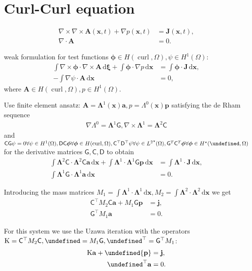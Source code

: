 \documentclass[12pt,a4paper,twoside]{article}
\let\div\undefined
\DeclareMathOperator{\div}{div}
\DeclareMathOperator{\curl}{curl}
\let\L\undefined
\newcommand{\L}{\mathrm{L}}
\newcommand{\K}{\mathrm{K}}
\newcommand{\du}{\,\mathrm{d}}
\newcommand{\ab}{{\mathbf{a}}}
\newcommand{\xb}{{\mathbf{x}}}
\newcommand{\jb}{{\mathbf{j}}}
\newcommand{\pb}{{\mathbf{p}}}
\newcommand{\Ab}{{\mathbf{A}}}
\newcommand{\phib}{{\boldsymbol{\phi}}}
\newcommand{\xib}{{\boldsymbol{\xi}}}
\newcommand{\Jb}{\mathbf{J}}
\newcommand{\C}{\ensuremath{\mathsf{C}}}
\newcommand{\D}{\ensuremath{\mathsf{D}}}
\newcommand{\G}{\ensuremath{\mathsf{G}}}
\newcommand{\Lab}{\ensuremath{\boldsymbol{\Lambda}}}
\numberwithin{equation}{section}
\begin{document}
\section{Curl-Curl equation}
\begin{align*}
\nabla \times \nabla \times \Ab(\xb,t) + \nabla p(\xb,t) &= \Jb(\xb,t), \\
\nabla \cdot \Ab &= 0.
\end{align*}


weak formulation for test functions $\phib \in H(\curl,\Omega),\psi \in H^1(\Omega)$:
\begin{align*}
\int \nabla \times \phib \cdot \nabla \times \Ab \du \xib + \int \phib \cdot \nabla p \du \xb &= \int \phib \cdot \Jb \du \xb, \\
-\int \nabla \psi \cdot \Ab \du \xb &= 0,
\end{align*}
where $\Ab \in H(\curl,\Omega), p \in H^1(\Omega)$.

Use finite element ansatz: $\Ab = \Lab^1(\xb) \ab, p = \Lambda^0(\xb) \pb$ satisfying the de Rham sequence
\begin{align*}
\nabla \Lambda^0 = \Lab^1 \G, \nabla \times \Lab^1 = \Lab^2 \C
\end{align*}
and $ \C \G \psi = 0 \forall \psi \in H^1(\Omega), \D \C \phib \forall \phib \in  H(\curl,\Omega), \C^\top \D^\top \psi \forall \psi  \in {L^2}^\star(\Omega), \G^T \C^T \phib \forall \phib \in  H^\star(\div,\Omega)$ for the derivative matrices $\G, \C, \D$ 
 to obtain
\begin{align*}
\int \Lab^2 \C \cdot \Lab^2 \C \ab \du \xb + \int \Lab^1 \cdot \Lab^1 \G \pb \du \xb &= \int \Lab^1 \cdot \Jb \du \xb, \\
\int \Lab^1 \G \cdot \Lab^1 \ab \du \xb &= 0.
\end{align*}

Introducing the mass matrices $M_1 = \int  \Lab^1 \cdot \Lab^1 \du \xb, M_2 = \int  \Lab^2 \cdot \Lab^2 \du \xb$ we get
\begin{align*}
\C^\top M_2 \C \ab + M_1 \G \pb &= \jb , \\
\G^\top M_1 \ab &= 0.
\end{align*} 

For this system we use the Uzawa iteration with the operators $\K =  \C^\top M_2 \C, \L= M_1 \G , \L^\top = \G^\top M_1$:
\begin{align*}
\K \ab + \L \pb &= \jb, \\
\L^\top \ab &= 0.
\end{align*}
\end{document}
